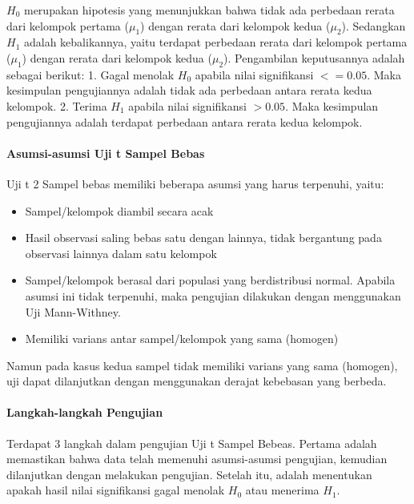 \documentclass[
]{book}
\providecommand{\tightlist}{%
  \setlength{\itemsep}{0pt}\setlength{\parskip}{0pt}}
\begin{document}
\(H_0\) merupakan hipotesis yang menunjukkan bahwa tidak ada perbedaan rerata dari kelompok pertama (\(\mu_1\)) dengan rerata dari kelompok kedua (\(\mu_2\)). Sedangkan \(H_1\) adalah kebalikannya, yaitu terdapat perbedaan rerata dari kelompok pertama (\(\mu_1\)) dengan rerata dari kelompok kedua (\(\mu_2\)). Pengambilan keputusannya adalah sebagai berikut:
1. Gagal menolak \(H_0\) apabila nilai signifikansi \(<= 0.05\). Maka kesimpulan pengujiannya adalah tidak ada perbedaan antara rerata kedua kelompok.
2. Terima \(H_1\) apabila nilai signifikansi \(> 0.05\). Maka kesimpulan pengujiannya adalah terdapat perbedaan antara rerata kedua kelompok.

\hypertarget{asumsi-asumsi-uji-t-sampel-bebas}{%
\paragraph{Asumsi-asumsi Uji t Sampel Bebas}\label{asumsi-asumsi-uji-t-sampel-bebas}}

Uji t 2 Sampel bebas memiliki beberapa asumsi yang harus terpenuhi, yaitu:

\begin{itemize}
\tightlist
\item
  Sampel/kelompok diambil secara acak
\item
  Hasil observasi saling bebas satu dengan lainnya, tidak bergantung pada observasi lainnya dalam satu kelompok
\item
  Sampel/kelompok berasal dari populasi yang berdistribusi normal. Apabila asumsi ini tidak terpenuhi, maka pengujian dilakukan dengan menggunakan Uji Mann-Withney.
\item
  Memiliki varians antar sampel/kelompok yang sama (homogen)
\end{itemize}

Namun pada kasus kedua sampel tidak memiliki varians yang sama (homogen), uji dapat dilanjutkan dengan menggunakan derajat kebebasan yang berbeda.

\hypertarget{langkah-langkah-pengujian}{%
\paragraph{Langkah-langkah Pengujian}\label{langkah-langkah-pengujian}}

Terdapat 3 langkah dalam pengujian Uji t Sampel Bebeas. Pertama adalah memastikan bahwa data telah memenuhi asumsi-asumsi pengujian, kemudian dilanjutkan dengan melakukan pengujian. Setelah itu, adalah menentukan apakah hasil nilai signifikansi gagal menolak \(H_0\) atau menerima \(H_1\).
\end{document}
